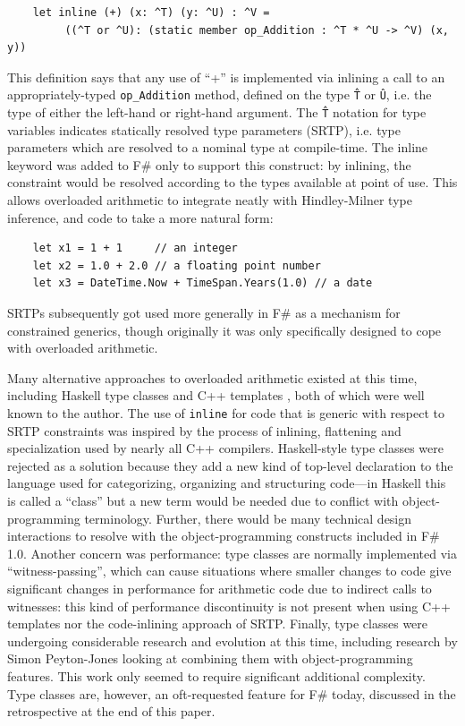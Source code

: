 \documentclass[acmsmall,screen]{acmart}
\begin{document}
\begin{verbatim}
    let inline (+) (x: ^T) (y: ^U) : ^V = 
         ((^T or ^U): (static member op_Addition : ^T * ^U -> ^V) (x, y))
\end{verbatim}

This definition says that any use of “+” is implemented via inlining a call to an appropriately-typed \texttt{op\_Addition} method, defined on
the type \texttt{\^T} or \texttt{\^U}, i.e. the type of either the left-hand or right-hand argument.  The \texttt{\^T} notation for type variables
indicates statically resolved type parameters (SRTP), i.e. type parameters which are resolved to a nominal type at compile-time.  The inline keyword
was added to F\# only to support this construct: by inlining, the constraint would be resolved according to the types available at point of use. This 
allows overloaded arithmetic to integrate neatly with Hindley-Milner type inference, and code to take a more natural form:

\begin{verbatim}
    let x1 = 1 + 1     // an integer
    let x2 = 1.0 + 2.0 // a floating point number
    let x3 = DateTime.Now + TimeSpan.Years(1.0) // a date
\end{verbatim}

SRTPs subsequently got used more generally in F\# as a mechanism for constrained generics, though originally it was only specifically designed to cope with overloaded arithmetic.

Many alternative approaches to overloaded arithmetic existed at this time, including Haskell type classes \citep{Jones97typeclasses,HistoryOfHaskell,WadlerBlott89} and
C++ templates \citep{Stroustrup}, both of which were well known to the author. The use of \texttt{inline} for code that is generic with respect to SRTP
constraints was inspired by the process of inlining, flattening and specialization used by nearly all C++ compilers. Haskell-style type classes
were rejected as a solution because they add a new kind of top-level declaration to the language used for categorizing, organizing and
structuring code---in Haskell this is called a ``class'' but a new term would be needed due to conflict with object-programming terminology.
Further, there would be many technical design interactions to resolve with the object-programming constructs included in F\# 1.0. Another
concern was performance: type classes are normally implemented via ``witness-passing'', which can cause situations where smaller changes
to code give significant changes in performance for arithmetic code due to indirect calls to witnesses: this kind of performance discontinuity
is not present when using C++ templates nor the code-inlining approach of SRTP. Finally, type classes were undergoing considerable
research and evolution at this time, including research by Simon Peyton-Jones looking at combining them with object-programming features. This
work only seemed to require significant additional complexity. Type classes are, however, an oft-requested feature for F\# today, discussed in the retrospective at the end of this paper.
\end{document}
